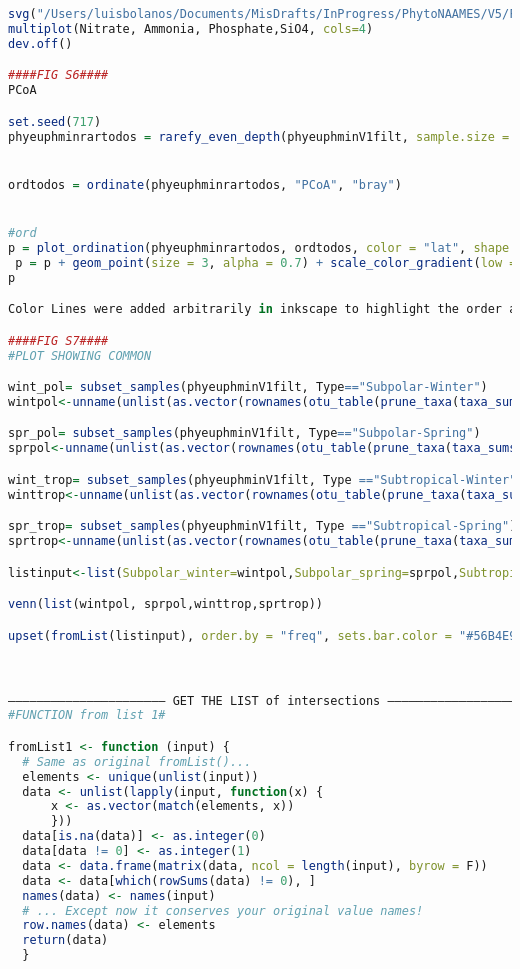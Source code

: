 \documentclass{article}
\begin{document}
\begin{lstlisting}[language=R,caption={N1N2figscripts}]
svg("/Users/luisbolanos/Documents/MisDrafts/InProgress/PhytoNAAMES/V5/Figures/nutr_profile.svg", width=16, height=12)
multiplot(Nitrate, Ammonia, Phosphate,SiO4, cols=4)
dev.off()

####FIG S6####
PCoA

set.seed(717)
phyeuphminrartodos = rarefy_even_depth(phyeuphminV1filt, sample.size = 1594)


ordtodos = ordinate(phyeuphminrartodos, "PCoA", "bray")


#ord
p = plot_ordination(phyeuphminrartodos, ordtodos, color = "lat", shape = "cruise")
 p = p + geom_point(size = 3, alpha = 0.7) + scale_color_gradient(low =  "#132B43", high ="red") + geom_text(aes(label = Station), size = 2.5, vjust = 2) + theme_bw()
p

Color Lines were added arbitrarily in inkscape to highlight the order and position of certain samples

####FIG S7####
#PLOT SHOWING COMMON

wint_pol= subset_samples(phyeuphminV1filt, Type=="Subpolar-Winter")
wintpol<-unname(unlist(as.vector(rownames(otu_table(prune_taxa(taxa_sums(wint_pol) > 0, wint_pol))))))

spr_pol= subset_samples(phyeuphminV1filt, Type=="Subpolar-Spring")
sprpol<-unname(unlist(as.vector(rownames(otu_table(prune_taxa(taxa_sums(spr_pol) > 0, spr_pol))))))

wint_trop= subset_samples(phyeuphminV1filt, Type =="Subtropical-Winter")
winttrop<-unname(unlist(as.vector(rownames(otu_table(prune_taxa(taxa_sums(wint_trop) > 0, wint_trop))))))

spr_trop= subset_samples(phyeuphminV1filt, Type =="Subtropical-Spring")
sprtrop<-unname(unlist(as.vector(rownames(otu_table(prune_taxa(taxa_sums(spr_trop) > 0, spr_trop))))))

listinput<-list(Subpolar_winter=wintpol,Subpolar_spring=sprpol,Subtropical_winter=winttrop,Subtropical_spring=sprtrop)

venn(list(wintpol, sprpol,winttrop,sprtrop))

upset(fromList(listinput), order.by = "freq", sets.bar.color = "#56B4E9")



—————————————————————— GET THE LIST of intersections —————————————————————
#FUNCTION from list 1#

fromList1 <- function (input) {
  # Same as original fromList()...
  elements <- unique(unlist(input))
  data <- unlist(lapply(input, function(x) {
      x <- as.vector(match(elements, x))
      }))
  data[is.na(data)] <- as.integer(0)
  data[data != 0] <- as.integer(1)
  data <- data.frame(matrix(data, ncol = length(input), byrow = F))
  data <- data[which(rowSums(data) != 0), ]
  names(data) <- names(input)
  # ... Except now it conserves your original value names!
  row.names(data) <- elements
  return(data)
  }


\end{lstlisting}
\end{document}
